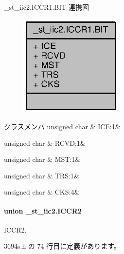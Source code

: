\+\_\+st\+\_\+iic2.\+I\+C\+C\+R1.\+B\+I\+T 連携図
\nopagebreak
\begin{figure}[H]
\begin{center}
\leavevmode
\includegraphics[width=146pt]{de/d5c/struct__st__iic2_8ICCR1_8BIT__coll__graph}
\end{center}
\end{figure}
\begin{DoxyFields}{クラスメンバ}
unsigned char\label{3694s_8h_a22fb77eba93786121faa55c581785893}
&
I\+C\+E\+:1&
\\
\hline

unsigned char\label{3694s_8h_ac1f89b90a18e92dbebed193e346d5dc0}
&
R\+C\+V\+D\+:1&
\\
\hline

unsigned char\label{3694s_8h_a9b64696be05602589dfa9ea20da1e5fe}
&
M\+S\+T\+:1&
\\
\hline

unsigned char\label{3694s_8h_a97b967a26a93584fcfa3aa99049c7ad3}
&
T\+R\+S\+:1&
\\
\hline

unsigned char\label{3694s_8h_a62e08e3df930b3022644f9943263a758}
&
C\+K\+S\+:4&
\\
\hline

\end{DoxyFields}
\label{union__st__iic2_8ICCR2}
\paragraph{union \+\_\+st\+\_\+iic2.\+I\+C\+C\+R2}
I\+C\+C\+R2. 

 3694s.\+h の 74 行目に定義があります。



